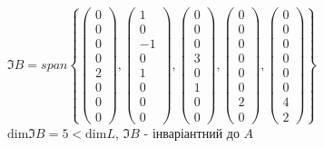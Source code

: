 \documentclass[a4paper, 14pt]{extarticle}
\def\dim#1{\textrm{dim} {#1}}
\begin{document}
$\Im B = span \left\{ \begin{pmatrix} 0 \\ 0 \\ 0 \\ 0 \\ 2 \\ 0 \\ 0 \\ 0 \end{pmatrix}, \begin{pmatrix} 1 \\ 0 \\ -1 \\ 0 \\ 1 \\ 0 \\ 0 \\ 0 \end{pmatrix}, \begin{pmatrix} 0 \\ 0 \\ 0 \\ 3 \\ 0 \\ 1 \\ 0 \\ 0 \end{pmatrix}, \begin{pmatrix} 0 \\ 0 \\ 0 \\ 0 \\ 0 \\ 0 \\ 2 \\ 0 \end{pmatrix}, \begin{pmatrix} 0 \\ 0 \\ 0 \\ 0 \\ 0 \\ 0 \\ 4 \\ 2 \end{pmatrix} \right\}$\\
$\dim \Im B = 5 < \dim L$, $\Im B$ - інваріантний до $A$\\
\end{document}
